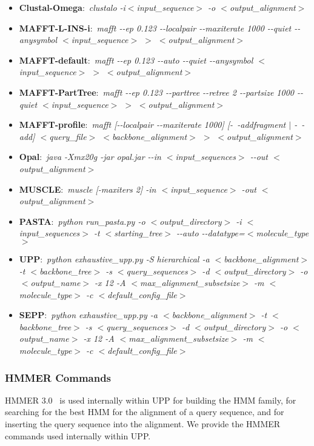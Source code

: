 \begin{itemize}
\item \textbf{Clustal-Omega}:~\emph{clustalo -i$<$input\_sequence$>$ -o $<$output\_alignment$>$}
\item \textbf{MAFFT-L-INS-i}:~\emph{mafft  -{}-ep 0.123 -{}-localpair -{}-maxiterate 1000 -{}-quiet -{}-anysymbol $<$input\_sequence$>$ $>$ $<$output\_alignment$>$}
\item \textbf{MAFFT-default}:~\emph{mafft  -{}-ep 0.123 -{}-auto -{}-quiet -{}-anysymbol $<$input\_sequence$>$ $>$ $<$output\_alignment$>$}
\item \textbf{MAFFT-PartTree}:~\emph{mafft -{}-ep 0.123 -{}-parttree -{}-retree 2 -{}-partsize 1000 -{}-quiet $<$input\_sequence$>$ $>$ $<$output\_alignment$>$}
\item \textbf{MAFFT-profile}:~\emph{mafft [-{}-localpair -{}-maxiterate 1000] [-~-addfragment $\vert$ -~-add] $<$query\_file$>$ $<$backbone\_alignment$>$ $>$ $<$output\_alignment$>$}
\item \textbf{Opal}:~\emph{java -Xmx20g -jar opal.jar -{}-in $<$input\_sequences$>$ -{}-out $<$output\_alignment$>$}
\item \textbf{MUSCLE}:~\emph{muscle [-maxiters 2] -in $<$input\_sequence$>$ -out $<$output\_alignment$>$}
\item \textbf{PASTA}:~\emph{python run\_pasta.py -o $<$output\_directory$>$ -i  $<$input\_sequences$>$ -t $<$starting\_tree$>$ -{}-auto -{}-datatype=$<$molecule\_type$>$}
\item \textbf{UPP}:~\emph{python exhaustive\_upp.py -S  hierarchical -a $<$backbone\_alignment$>$ -t $<$backbone\_tree$>$ -s $<$query\_sequences$>$ -d $<$output\_directory$>$ -o $<$output\_name$>$ -x 12 -A $<$max\_alignment\_subsetsize$>$ -m $<$molecule\_type$>$ -c $<$default\_config\_file$>$}
\item \textbf{SEPP}:~\emph{python exhaustive\_upp.py -a $<$backbone\_alignment$>$ -t $<$backbone\_tree$>$ -s $<$query\_sequences$>$ -d $<$output\_directory$>$ -o $<$output\_name$>$ -x 12 -A $<$max\_alignment\_subsetsize$>$ -m $<$molecule\_type$>$ -c $<$default\_config\_file$>$}

\end{itemize}

\subsubsection{HMMER Commands}\label{hmm_commands}
HMMER 3.0~\cite{Eddy1998} is used internally within UPP for building the HMM family, for searching for the best HMM for the alignment of a query sequence, and for inserting the query sequence into the alignment.  We provide the HMMER commands used internally within UPP.

